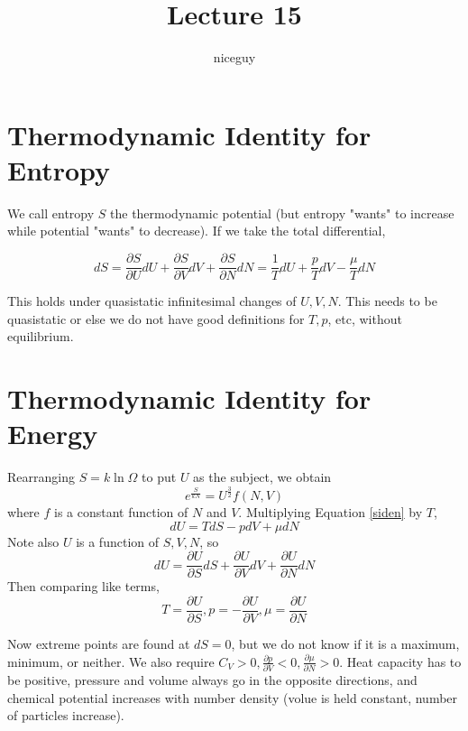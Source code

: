 \documentclass[12pt]{article}
\author{niceguy}
\title{Lecture 15}
\begin{document}
\maketitle

\section{Thermodynamic Identity for Entropy}

We call entropy $S$ the thermodynamic potential (but entropy "wants" to increase while potential "wants" to decrease). If we take the total differential,

\begin{equation}\label{siden}
    dS = \frac{\partial S}{\partial U}dU + \frac{\partial S}{\partial V}dV + \frac{\partial S}{\partial N}dN = \frac{1}{T} dU + \frac{p}{T} dV - \frac{\mu}{T} dN
\end{equation}

This holds under quasistatic infinitesimal changes of $U,V,N$. This needs to be quasistatic or else we do not have good definitions for $T, p$, etc, without equilibrium.

\section{Thermodynamic Identity for Energy}

Rearranging $S=k\ln\Omega$ to put $U$ as the subject, we obtain
$$e^{\frac{S}{kN}} = U^{\frac{3}{2}}f(N,V)$$
where $f$ is a constant function of $N$ and $V$. Multiplying Equation \ref{siden} by $T$,
$$dU = TdS - pdV + \mu dN$$
Note also $U$ is a function of $S,V,N$, so
$$dU = \frac{\partial U}{\partial S}dS + \frac{\partial U}{\partial V}dV + \frac{\partial U}{\partial N}dN$$
Then comparing like terms,
$$T = \frac{\partial U}{\partial S}, p = -\frac{\partial U}{\partial V}, \mu = \frac{\partial U}{\partial N}$$

Now extreme points are found at $dS=0$, but we do not know if it is a maximum, minimum, or neither. We also require $C_V > 0, \frac{\partial p}{\partial V} < 0, \frac{\partial \mu}{\partial N} > 0$. Heat capacity has to be positive, pressure and volume always go in the opposite directions, and chemical potential increases with number density (volue is held constant, number of particles increase).
\end{document}
